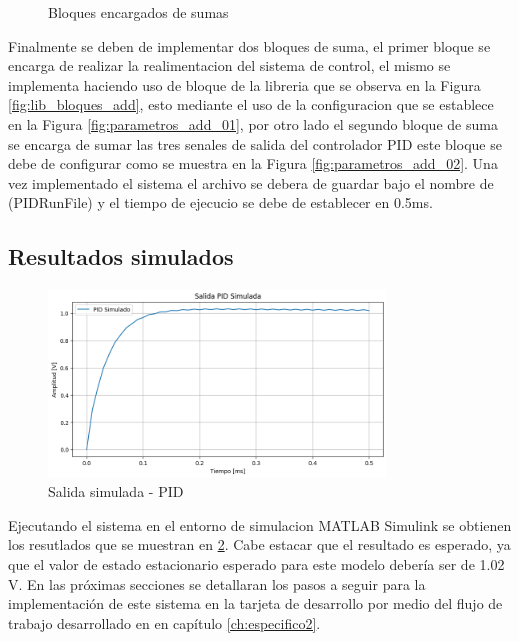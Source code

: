\begin{figure}[htbp]
    \caption{Bloques encargados de sumas}
    \label{fig:arreglo_add}
\end{figure}

\newpage

Finalmente se deben de implementar dos bloques de suma, el primer bloque se encarga de realizar la realimentacion del sistema de control, el mismo se implementa haciendo uso de bloque de la libreria que se observa en la Figura \ref{fig:lib_bloques_add}, esto mediante el uso de la configuracion que se establece en la Figura \ref{fig:parametros_add_01}, por otro lado el segundo bloque de suma se encarga de sumar las tres senales de salida del controlador PID este bloque se debe de configurar como se muestra en la Figura \ref{fig:parametros_add_02}. Una vez implementado el sistema el archivo se debera de guardar bajo el nombre de (PIDRunFile) y el tiempo de ejecucio se debe de establecer en 0.5ms. 

\subsection{Resultados simulados}\label{subsub:resultados_simulados_PID}

\begin{figure}[h!]
    \centering
    \includegraphics[width=0.8\textwidth]{fig/Capitulo5/Caso_de_estudio_PID/datos/simulada.png}
    \caption{Salida simulada - PID }
    \label{fig:salida_simulada_PID}
\end{figure}


Ejecutando el sistema en el entorno de simulacion MATLAB Simulink se obtienen los resutlados que se muestran en \ref{fig:salida_simulada_PID}. Cabe estacar que el resultado es esperado, ya que el valor de estado estacionario esperado para este modelo debería ser de 1.02 V. En las próximas secciones se detallaran los pasos a seguir para la implementación de este sistema en la tarjeta de desarrollo por medio del flujo de trabajo desarrollado en en capítulo \ref{ch:especifico2}. 


